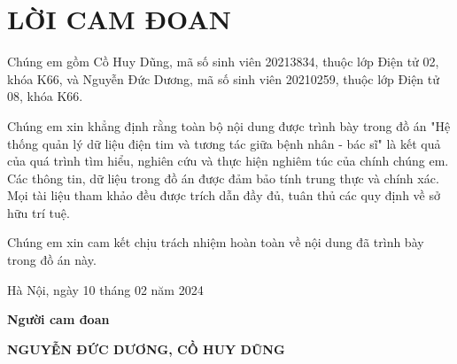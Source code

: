 \section*{LỜI CAM ĐOAN} %
\thispagestyle{empty}

Chúng em gồm Cồ Huy Dũng, mã số sinh viên 20213834, thuộc lớp Điện tử 02, khóa K66, và Nguyễn Đức Dương, mã số sinh viên 20210259, thuộc lớp Điện tử 08, khóa K66.

Chúng em xin khẳng định rằng toàn bộ nội dung được trình bày trong đồ án "Hệ thống quản lý dữ liệu điện tim và tương tác giữa bệnh nhân - bác sĩ" là kết quả của quá trình tìm hiểu, nghiên cứu và thực hiện nghiêm túc của chính chúng em.
Các thông tin, dữ liệu trong đồ án được đảm bảo tính trung thực và chính xác. Mọi tài liệu tham khảo đều được trích dẫn đầy đủ, tuân thủ các quy định về sở hữu trí tuệ. 

Chúng em xin cam kết chịu trách nhiệm hoàn toàn về nội dung đã trình bày trong đồ án này.


\vspace{6pt}

\hspace{8cm}Hà Nội, ngày 10 tháng 02 năm 2024

\hspace{9.8cm}\textbf{Người cam đoan}

\vspace{2cm}
\hspace{7.3cm}\textbf{NGUYỄN ĐỨC DƯƠNG,  CỒ HUY DŨNG}

\cleardoublepage